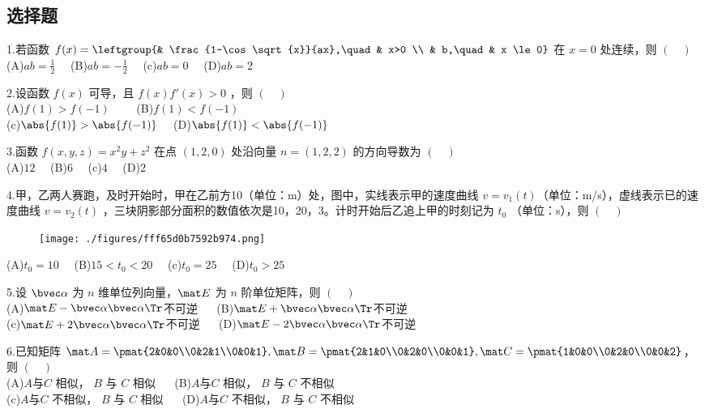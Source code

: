 
\subsection{选择题}
1.若函数 $f(x)=\leftgroup{& \frac{1-\cos \sqrt{x}}{ax},\quad  & x>0 \\ & b,\quad & x \le 0}$ 在 $x=0$ 处连续，则 $(\quad)$\\
(A)$ab=\frac{1}{2} \quad$
(B)$ab=-\frac{1}{2} \quad$
(c)$ab=0 \quad$
(D)$ab=2 \quad$

2.设函数 $f(x)$ 可导，且 $f(x)f'(x)>0$ ，则 $(\quad)$ \\
(A)$f(1)>f(-1) \qquad$
(B)$f(1)<f(-1) \quad$\\
(c)$\abs{f(1)}>\abs{f(-1)} \quad$
(D)$\abs{f(1)}<\abs{f(-1)} $

3.函数 $f(x,y,z)=x^2y+z^2$ 在点 $(1,2,0)$ 处沿向量 $n=(1,2,2)$ 的方向导数为 $(\quad)$\\
(A)$12 \quad$
(B)$6 \quad$
(c)$4 \quad$
(D)$2 \quad$


4.甲，乙两人赛跑，及时开始时，甲在乙前方10（单位：m）处，图中，实线表示甲的速度曲线 $v=v_1(t)$（单位：m/s），虚线表示已的速度曲线 $v=v_2(t)$ ，三块阴影部分面积的数值依次是10，20，3。计时开始后乙追上甲的时刻记为 $t_0$ （单位：s），则 $(\quad)$\\
\begin{figure}[ht]
\centering
\texttt{[image: ./figures/fff65d0b7592b974.png]}
\caption{} \label{fig_PeeM17_1}
\end{figure}
(A)$t_0=10 \quad$
(B)$15<t_0<20 \quad $
(c)$t_0=25\quad$
(D)$t_0>25$

5.设 $\bvec \alpha$ 为 $n$ 维单位列向量，$\mat E$ 为 $n$ 阶单位矩阵，则 $(\quad)$\\
(A)$\mat E- \bvec \alpha \bvec \alpha \Tr$不可逆 $\quad$
(B)$\mat E+ \bvec \alpha \bvec \alpha \Tr$不可逆\\
(c)$\mat E+ 2\bvec \alpha \bvec \alpha \Tr$不可逆 $\quad$
(D)$\mat E- 2\bvec \alpha \bvec \alpha \Tr$不可逆

6.已知矩阵 $\mat A=\pmat{2&0&0\\0&2&1\\0&0&1},\mat B=\pmat{2&1&0\\0&2&0\\0&0&1},\mat C=\pmat{1&0&0\\0&2&0\\0&0&2}$，则 $(\quad)$\\
(A)$A$与$C$ 相似， $B$ 与 $C$ 相似 $\quad$
(B)$A$与$C$ 相似， $B$ 与 $C$ 不相似 \\
(c)$A$与$C$ 不相似， $B$ 与 $C$ 相似 $\quad$
(D)$A$与$C$ 不相似， $B$ 与 $C$ 不相似 $\quad$

